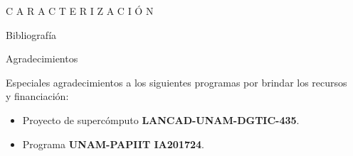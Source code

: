 \documentclass[final]{beamer}
\newlength{\sepwidth}
\newlength{\colwidth}
\newcommand{\separatorcolumn}{\begin{column}{\sepwidth}\end{column}}
\begin{document}
\begin{frame}[t]
\begin{columns}[t]
\begin{column}{\colwidth}
\begin{block}{C A R A C T E R I Z A C I Ó N }{}
			\end{block}	

			\begin{block}{Bibliografía}
				\printbibliography[heading=none]
			\end{block}

			\begin{thm}{Agradecimientos}{}
				
				Especiales agradecimientos a los siguientes programas por brindar los recursos y financiación:
				\begin{itemize}
					\item Proyecto de supercómputo \textbf{LANCAD-UNAM-DGTIC-435}.
					\item Programa \textbf{UNAM-PAPIIT IA201724}.
				\end{itemize}
				
				
			\end{thm}

		\end{column}
		
		\separatorcolumn
	\end{columns}
\end{frame}
\end{document}
